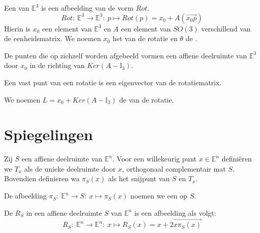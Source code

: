 \documentclass[main.tex]{subfiles}
\begin{document}
\begin{de}
  Een  van $\mathbb{E}^{3}$ is een afbeelding van de vorm $Rot$.
  \[ Rot:\ \mathbb{E}^{3} \rightarrow \mathbb{E}^{3}:\ p \mapsto Rot(p) = x_{0} + A(\overrightarrow{x_{0}p}) \]
  Hierin is $x_{0}$ een element van $\mathbb{E}^{3}$ en $A$ een element van $SO(3)$ verschillend van de eenheidsmatrix.
  We noemen $x_{0}$ het  van de rotatie en $\theta$ de .
\end{de}


\begin{st}
  De punten die op zichzelf worden afgebeeld vormen een affiene deelruimte van $\mathbb{E}^{3}$ door $x_{0}$ in de richting van $Ker(A-\mathbb{I}_{3})$.
\end{st}

\begin{st}
  Een vast punt van een rotatie is een eigenvector van de rotatiematrix.
\end{st}

\begin{de}
  We noemen $L = x_{0} + Ker(A-\mathbb{I}_{3})$ de  van de rotatie.
\end{de}

\section{Spiegelingen}
\label{sec:spiegelingen}

\begin{de}
  Zij $S$ een affiene deelruimte van $\mathbb{E}^{n}$.
  Voor een willekeurig punt $x\in \mathbb{E}^{n}$ defini\"eren we $T_{x}$ als de unieke deelruimte door $x$, orthogonaal complementair mat $S$.
  Bovendien definieren wa $\pi_{S}(x)$ als het snijpunt van $S$ en $T_{x}$.
\end{de}
 
\begin{de}
  De afbeelding $\pi_{S}:\ \mathbb{E}^{n} \rightarrow S:\ x \mapsto \pi_{S}(x)$ noemen we een  op $S$.
\end{de}

\begin{de}
  De  $R_{S}$ in een affiene deelruimte $S$ van $\mathbb{E}^{n}$ is een afbeelding als volgt:
  \[ R_{S}:\ \mathbb{E}^{n} \rightarrow \mathbb{E}^{n}:\ x \mapsto R_{S}(x) = x + 2\overrightarrow{x\pi_{S}(x)} \]
\end{de}
\end{document}
